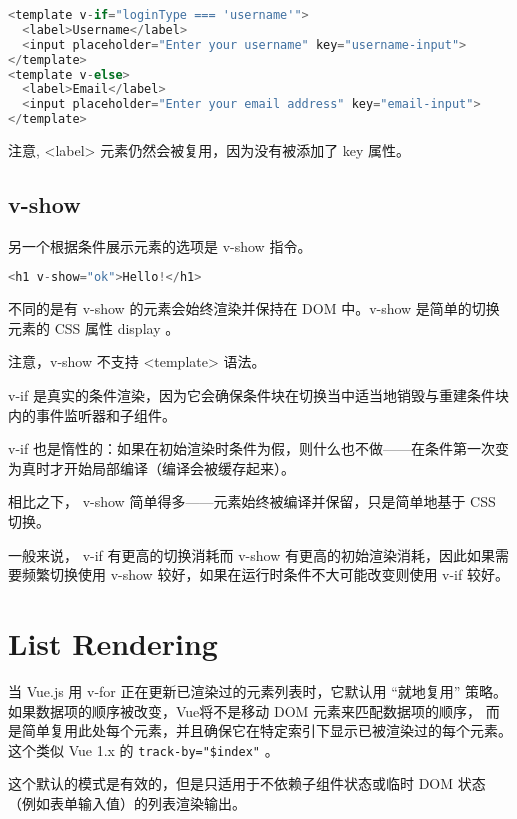 \begin{lstlisting}[language=JavaScript]
<template v-if="loginType === 'username'">
  <label>Username</label>
  <input placeholder="Enter your username" key="username-input">
</template>
<template v-else>
  <label>Email</label>
  <input placeholder="Enter your email address" key="email-input">
</template>
\end{lstlisting}

注意, <label> 元素仍然会被复用，因为没有被添加了 key 属性。


\subsection{v-show}

另一个根据条件展示元素的选项是 v-show 指令。


\begin{lstlisting}[language=JavaScript]
<h1 v-show="ok">Hello!</h1>
\end{lstlisting}

不同的是有 v-show 的元素会始终渲染并保持在 DOM 中。v-show 是简单的切换元素的 CSS 属性 display 。


注意，v-show 不支持 <template> 语法。

\begin{compactitem}
\item v-if 是真实的条件渲染，因为它会确保条件块在切换当中适当地销毁与重建条件块内的事件监听器和子组件。
\item v-if 也是惰性的：如果在初始渲染时条件为假，则什么也不做——在条件第一次变为真时才开始局部编译（编译会被缓存起来）。
\end{compactitem}


相比之下， v-show 简单得多——元素始终被编译并保留，只是简单地基于 CSS 切换。

一般来说， v-if 有更高的切换消耗而 v-show 有更高的初始渲染消耗，因此如果需要频繁切换使用 v-show 较好，如果在运行时条件不大可能改变则使用 v-if 较好。


\section{List Rendering}


当 Vue.js 用 v-for 正在更新已渲染过的元素列表时，它默认用 “就地复用” 策略。如果数据项的顺序被改变，Vue将不是移动 DOM 元素来匹配数据项的顺序， 而是简单复用此处每个元素，并且确保它在特定索引下显示已被渲染过的每个元素。这个类似 Vue 1.x 的 \texttt{track-by="\$index"} 。

这个默认的模式是有效的，但是只适用于不依赖子组件状态或临时 DOM 状态（例如表单输入值）的列表渲染输出。

